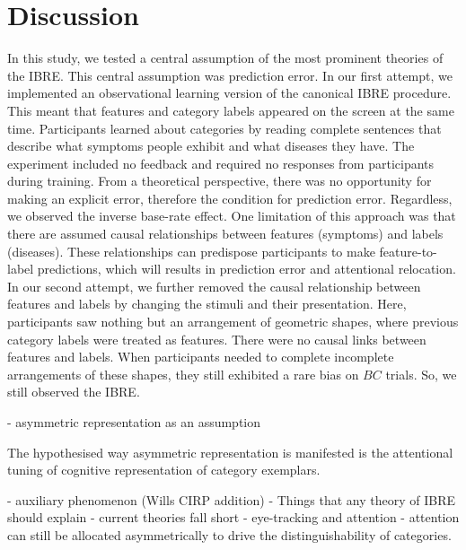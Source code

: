 \documentclass[10pt,letterpaper]{article}
\begin{document}
\section{Discussion}

In this study, we tested a central assumption of the most prominent theories of the IBRE.
This central assumption was prediction error.
In our first attempt, we implemented an observational learning version of the canonical IBRE procedure.
This meant that features and category labels appeared on the screen at the same time.
Participants learned about categories by reading complete sentences that describe what symptoms people exhibit and what diseases they have.
The experiment included no feedback and required no responses from participants during training.
From a theoretical perspective, there was no opportunity for making an explicit error, therefore the condition for prediction error.
Regardless, we observed the inverse base-rate effect.
One limitation of this approach was that there are assumed causal relationships between features (symptoms) and labels (diseases).
These relationships can predispose participants to make feature-to-label predictions, which will results in prediction error and attentional relocation.
In our second attempt, we further removed the causal relationship between features and labels by changing the stimuli and their presentation.
Here, participants saw nothing but an arrangement of geometric shapes, where previous category labels were treated as features.
There were no causal links between features and labels.
When participants needed to complete incomplete arrangements of these shapes, they still exhibited a rare bias on $BC$ trials.
So, we still observed the IBRE.



- asymmetric representation as an assumption

The hypothesised way asymmetric representation is manifested is the attentional tuning of cognitive representation of category exemplars.

- auxiliary phenomenon (Wills CIRP addition)
- Things that any theory of IBRE should explain
- current theories fall short
- eye-tracking and attention
- attention can still be allocated asymmetrically to drive the distinguishability of categories.
\end{document}
